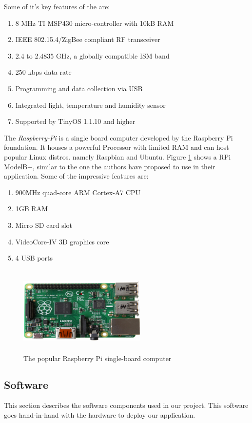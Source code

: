 \documentclass{sig-alternate-05-2015}
\begin{document}
Some of it's key features of the are:
\begin{enumerate}
\item 8 MHz TI MSP430 micro-controller with 10kB RAM
\item IEEE 802.15.4/ZigBee compliant RF transceiver 
\item 2.4 to 2.4835 GHz, a globally compatible ISM band
\item 250 kbps data rate
\item Programming and data collection via USB
\item Integrated light, temperature and humidity sensor
\item Supported by TinyOS 1.1.10 and higher
\end{enumerate}

The \textit{Raspberry-Pi} is a single board computer developed by the Raspberry Pi foundation. It houses a powerful Processor with limited RAM and can host popular Linux distros. namely Raspbian and Ubuntu. Figure \ref{rpi} shows a RPi ModelB+, similar to the one the authors have proposed to use in their application.
Some of the impressive features are:
\begin{enumerate}
\item 900MHz quad-core ARM Cortex-A7 CPU
\item 1GB RAM
\item Micro SD card slot
\item VideoCore-IV 3D graphics core
\item 4 USB ports
\end{enumerate}

\begin{figure}[hbtp]
\centering
\includegraphics[height=1.75in, width=2.5in]{RPi2.jpg}
\caption{The popular Raspberry Pi single-board computer}
\label{rpi}
\end{figure}

\subsection{Software}
This section describes the software components used in our project. This software goes hand-in-hand with the hardware to deploy our application.\\
\end{document}
